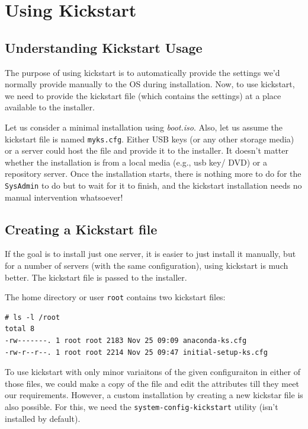\chapter{Using Kickstart}

\section{Understanding Kickstart Usage}
The purpose of using kickstart is to automatically provide the settings we'd normally provide manually to the OS during installation. Now, to use kickstart, we need to provide the kickstart file (which contains the settings) at a place available to the installer.

Let us consider a minimal installation using \textit{boot.iso}. Also, let us assume the kickstart file is named \verb|myks.cfg|. Either USB keys (or any other storage media) or a server could host the file and provide it to the installer. It doesn't matter whether the installation is from a local media (e.g., usb key/ DVD) or a repository server. Once the installation starts, there is nothing more to do for the \verb|SysAdmin| to do but to wait for it to finish, and the kickstart installation needs no manual intervention whatsoever!

\section{Creating a Kickstart file}
If the goal is to install just one server, it is easier to just install it manually, but for a number of servers (with the same configuration), using kickstart is much better. The kickstart file is passed to the installer.

The home directory or user \verb|root| contains two kickstart files: 

\vspace{-15pt}
\begin{verbatim}
# ls -l /root
total 8
-rw-------. 1 root root 2183 Nov 25 09:09 anaconda-ks.cfg
-rw-r--r--. 1 root root 2214 Nov 25 09:47 initial-setup-ks.cfg
\end{verbatim}
\vspace{-10pt}

\noindent
To use kickstart with only minor variaitons of the given configuraiton in either of those files, we could make a copy of the file and edit the attributes till they meet our requirements. However, a custom installation by creating a new kickstar file is also possible. For this, we need the \verb|system-config-kickstart| utility (isn't installed by default). 

